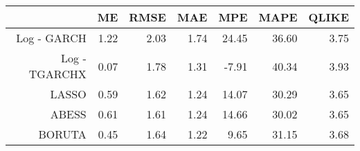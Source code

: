 \begin{table}[ht]
\centering
\begin{tabular}{rrrrrrr}
  \hline
 & ME & RMSE & MAE & MPE & MAPE & QLIKE \\ 
  \hline
Log - GARCH & 1.22 & 2.03 & 1.74 & 24.45 & 36.60 & 3.75 \\ 
  Log - TGARCHX & 0.07 & 1.78 & 1.31 & -7.91 & 40.34 & 3.93 \\ 
  LASSO & 0.59 & 1.62 & 1.24 & 14.07 & 30.29 & 3.65 \\ 
  ABESS & 0.61 & 1.61 & 1.24 & 14.66 & 30.02 & 3.65 \\ 
  BORUTA & 0.45 & 1.64 & 1.22 & 9.65 & 31.15 & 3.68 \\ 
   \hline
\end{tabular}
\end{table}
